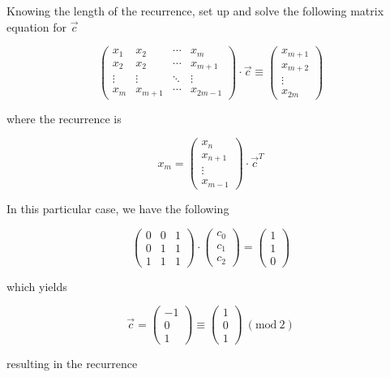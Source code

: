 \documentclass[12pt]{article}
\renewcommand{\mod}[1]{\mathrm{mod}\ #1}
\renewcommand{\pmod}[1]{\ (\mod{#1})}
\begin{document}
Knowing the length of the recurrence, set up and solve the following matrix equation for $\vec{c}$

$$\begin{pmatrix}x_1 & x_2 & \cdots & x_m \\ x_2 & x_2 & \cdots & x_{m+1} \\ \vdots & \vdots & \ddots & \vdots \\ x_m & x_{m+1} & \cdots & x_{2m - 1}\end{pmatrix} \cdot \vec{c} \equiv \begin{pmatrix}x_{m+1} \\ x_{m+2} \\ \vdots \\ x_{2m}\end{pmatrix}$$

where the recurrence is

$$x_m = \begin{pmatrix}x_{n} \\ x_{n + 1} \\ \vdots \\ x_{m - 1}\end{pmatrix} \cdot \vec{c}^T$$

In this particular case, we have the following

$$\begin{pmatrix}0 & 0 & 1 \\ 0 & 1 & 1 \\ 1 & 1 & 1\end{pmatrix}\cdot\begin{pmatrix}c_0 \\ c_1 \\ c_2\end{pmatrix} = \begin{pmatrix}1 \\ 1 \\ 0\end{pmatrix}$$

which yields

$$\vec{c} = \begin{pmatrix}-1 \\ 0 \\ 1\end{pmatrix} \equiv \begin{pmatrix}1 \\ 0 \\ 1\end{pmatrix} \pmod{2}$$

resulting in the recurrence
\end{document}
